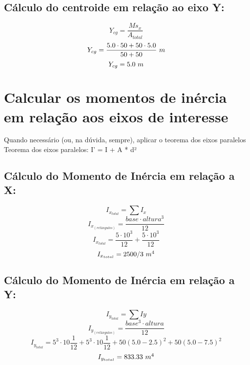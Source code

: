 \documentclass[a4paper,12pt]{article}%
\begin{document}
%
\subsection{Cálculo do centroide em relação ao eixo Y:}%
\label{subsec:ClculodocentroideemrelaoaoeixoY}%
\begin{dmath*}%
Y_{cg} = \frac{Ms_x}{A_{total}}%
\end{dmath*}%
\begin{dmath*}%
Y_{cg} = \frac{5.0 \cdot 50 + 50 \cdot 5.0}{50 + 50}$ $m%
\end{dmath*}%
\begin{dmath*}%
Y_{cg} = 5.0$ $m%
\end{dmath*}

%
\section{Calcular os momentos de inércia em relação aos eixos de interesse}%
\label{sec:Calcularosmomentosdeinrciaemrelaoaoseixosdeinteresse}%
Quando necessário (ou, na dúvida, sempre), aplicar o teorema dos eixos paralelos \\%
Teorema dos eixos paralelos: I' = I + A * d² \\%
\subsection{Cálculo do Momento de Inércia em relação a X:}%
\label{subsec:ClculodoMomentodeInrciaemrelaoaX}%
\begin{dmath*}%
I_{x_{total}} = \sum{I_x}%
\end{dmath*}%
\begin{dmath*}%
I_{x_{(retângulos)}} = \frac{base \cdot altura^3}{12}%
\end{dmath*}%
\begin{dmath*}%
I_{x_{total}} = \frac{5 \cdot 10^{3}}{12} + \frac{5 \cdot 10^{3}}{12}%
\end{dmath*}%
\begin{dmath*}%
I_{x_{total}} = 2500/3$ $m^4%
\end{dmath*}

%
\subsection{Cálculo do Momento de Inércia em relação a Y:}%
\label{subsec:ClculodoMomentodeInrciaemrelaoaY}%
\begin{dmath*}%
I_{y_{total}} = \sum{Iy}%
\end{dmath*}%
\begin{dmath*}%
I_{y_{(retângulos)}} = \frac{base^3 \cdot altura}{12}%
\end{dmath*}%
\begin{dmath*}%
I_{y_{total}} = 5^{3} \cdot 10 \frac{1}{12} + 5^{3} \cdot 10 \frac{1}{12} + 50 \left(5.0 - 2.5\right)^{2} + 50 \left(5.0 - 7.5\right)^{2}%
\end{dmath*}%
\begin{dmath*}%
I_{y_{total}} = 833.33$ $m^4%
\end{dmath*}
\end{document}
